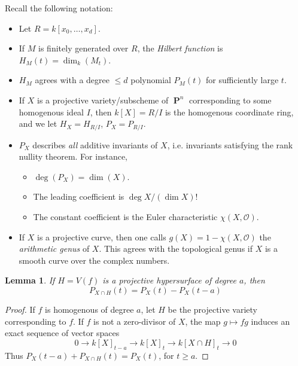 \documentclass{article}
\theoremstyle{plain}
\newtheorem{lemma}[theorem]{Lemma}
\DeclareMathOperator{\PP}{\mathbf{P}}
\begin{document}
Recall the following notation:
%
\begin{itemize}
    \item Let $R = k[x_0, \dots, x_d]$.

    \item If $M$ is finitely generated over $R$, the {\it Hilbert function} is $H_M(t) = \dim_k(M_t)$.

    \item $H_M$ agrees with a degree $\leq d$ polynomial $P_M(t)$ for sufficiently large $t$.


    \item If $X$ is a projective variety/subscheme of $\PP^n$ corresponding to some homogenous ideal $I$, then $k[X] = R/I$ is the homogenous coordinate ring, and we let $H_X = H_{R/I}$, $P_X = P_{R/I}$.

    \item $P_X$ describes {\it all} additive invariants of $X$, i.e. invariants satisfying the rank nullity theorem. For instance,
    \begin{itemize}
        \item $\deg(P_X) = \dim(X)$.
        \item The leading coefficient is $\deg X / (\dim X)!$
        \item The constant coefficient is the Euler characteristic $\chi(X,\mathcal{O})$.
    \end{itemize}

    \item If $X$ is a projective curve, then one calls $g(X) = 1 - \chi(X,\mathcal{O})$ the {\it arithmetic genus} of $X$. This agrees with the topological genus if $X$ is a smooth curve over the complex numbers.
\end{itemize}

\begin{lemma}
    If $H = V(f)$ is a projective hypersurface of degree $a$, then
    \[ P_{X \cap H}(t) = P_X(t) - P_X(t-a) \]
\end{lemma}
\begin{proof}
    If $f$ is homogenous of degree $a$, let $H$ be the projective variety corresponding to $f$. If $f$ is not a zero-divisor of $X$, the map $g \mapsto fg$ induces an exact sequence of vector spaces
    \[ 0 \to k[X]_{t-a} \to k[X]_t \to k[X \cap H]_t \to 0 \]
    Thus $P_X(t-a) + P_{X \cap H}(t) = P_X(t)$, for $t \geq a$.
\end{proof}
\end{document}
